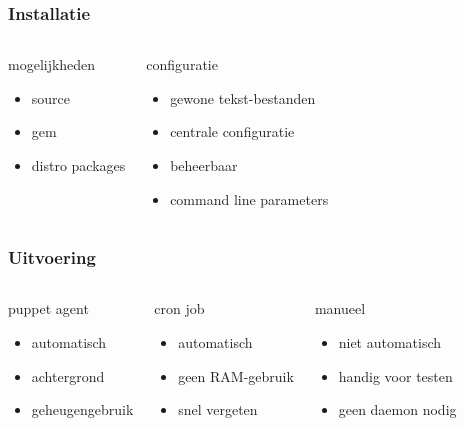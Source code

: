 \documentclass{beamer}
\begin{document}
\begin{frame}
\frametitle{Installatie}
\begin{columns}[c]
\begin{block}{mogelijkheden}
\begin{itemize}
	\item source
	\item gem
	\item distro packages
\end{itemize}
\end{block}
\begin{block}{configuratie}
\begin{itemize}
	\item gewone tekst-bestanden
	\item centrale configuratie
	\item beheerbaar
	\item command line parameters
\end{itemize}
\end{block}
\end{columns}
\end{frame}

\begin{frame}
\frametitle{Uitvoering}
\begin{columns}[c]
\begin{block}{puppet agent}
\begin{itemize}
	\item automatisch
	\item achtergrond
	\item geheugengebruik
\end{itemize}
\end{block}
\begin{block}{cron job}
\begin{itemize}
	\item automatisch
	\item geen RAM-gebruik
	\item snel vergeten
\end{itemize}
\end{block}
\begin{block}{manueel}
\begin{itemize}
	\item niet automatisch
	\item handig voor testen
	\item geen daemon nodig
\end{itemize}
\end{block}
\end{columns}
\end{frame}
\end{document}
